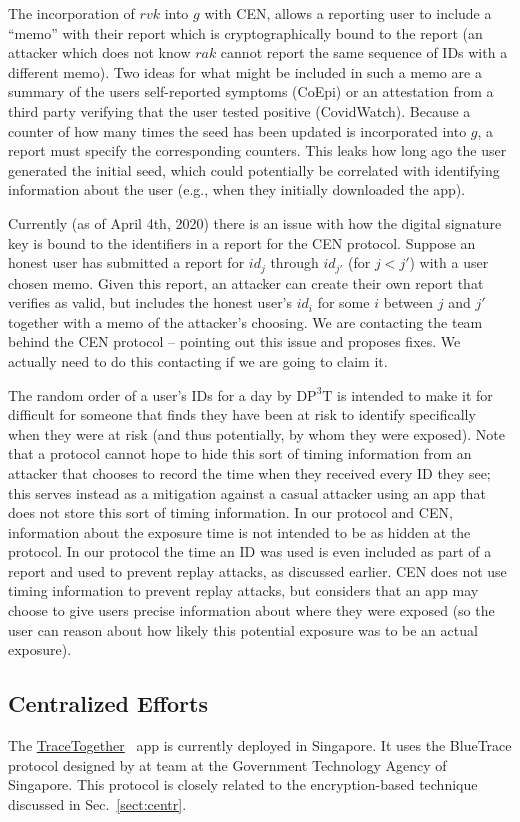 \documentclass{article}
\newcommand{\TODO}[1]{ {\color{blue} #1 }}
\begin{document}
The incorporation of $rvk$ into $g$ with CEN, allows a reporting user to include a ``memo'' with their report which is cryptographically bound to the report (an attacker which does not know $rak$ cannot report the same sequence of IDs with a different memo). Two ideas for what might be included in such a memo are a summary of the users self-reported symptoms (CoEpi) or an attestation from a third party verifying that the user tested positive (CovidWatch). Because a counter of how many times the seed has been updated is incorporated into $g$, a report must specify the corresponding counters. This leaks how long ago the user generated the initial seed, which could potentially be correlated with identifying information about the user (e.g., when they initially downloaded the app). 

Currently (as of April 4th, 2020) there is an issue with how the digital signature key is bound to the identifiers in a report for the CEN protocol.
Suppose an honest user has submitted a report for $id_{j}$ through $id_{j'}$ (for $j<j'$) with a user chosen memo. 
Given this report, an attacker can create their own report that verifies as valid, but includes the honest user's $id_{i}$ for some $i$ between $j$ and $j'$ together with a memo of the attacker's choosing.
We are contacting the team behind the CEN protocol -- pointing out this issue and proposes fixes.
\TODO{We actually need to do this contacting if we are going to claim it.}

The random order of a user's IDs for a day by $\mathrm{DP^3T}$ is intended to make it for difficult for someone that finds they have been at risk to identify specifically when they were at risk (and thus potentially, by whom they were exposed).
Note that a protocol cannot hope to hide this sort of timing information from an attacker that chooses to record the time when they received every ID they see; this serves instead as a mitigation against a casual attacker using an app that does not store this sort of timing information.  
In our protocol and CEN, information about the exposure time is not intended to be as hidden at the protocol. In our protocol the time an ID was used is even included as part of a report and used to prevent replay attacks, as discussed earlier.
CEN does not use timing information to prevent replay attacks, but considers that an app may choose to give users precise information about where they were exposed (so the user can reason about how likely this potential exposure was to be an actual exposure).

\subsection{Centralized Efforts}
The \href{https://www.tracetogether.gov.sg/}{TraceTogether}~\cite{tracetogether} app is currently deployed in Singapore.
It uses the BlueTrace protocol designed by at team at the Government Technology Agency of Singapore.
This protocol is closely related to the encryption-based technique discussed in Sec.~\ref{sect:centr}.
\end{document}
